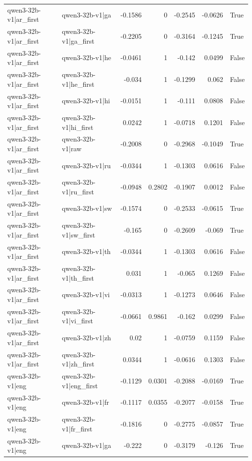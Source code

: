 \begin{table}
\begin{tabular}{l l r r r r l}
qwen3-32b-v1|ar_first & qwen3-32b-v1|ga & -0.1586 & 0 & -0.2545 & -0.0626 & True \\
qwen3-32b-v1|ar_first & qwen3-32b-v1|ga_first & -0.2205 & 0 & -0.3164 & -0.1245 & True \\
qwen3-32b-v1|ar_first & qwen3-32b-v1|he & -0.0461 & 1 & -0.142 & 0.0499 & False \\
qwen3-32b-v1|ar_first & qwen3-32b-v1|he_first & -0.034 & 1 & -0.1299 & 0.062 & False \\
qwen3-32b-v1|ar_first & qwen3-32b-v1|hi & -0.0151 & 1 & -0.111 & 0.0808 & False \\
qwen3-32b-v1|ar_first & qwen3-32b-v1|hi_first & 0.0242 & 1 & -0.0718 & 0.1201 & False \\
qwen3-32b-v1|ar_first & qwen3-32b-v1|raw & -0.2008 & 0 & -0.2968 & -0.1049 & True \\
qwen3-32b-v1|ar_first & qwen3-32b-v1|ru & -0.0344 & 1 & -0.1303 & 0.0616 & False \\
qwen3-32b-v1|ar_first & qwen3-32b-v1|ru_first & -0.0948 & 0.2802 & -0.1907 & 0.0012 & False \\
qwen3-32b-v1|ar_first & qwen3-32b-v1|sw & -0.1574 & 0 & -0.2533 & -0.0615 & True \\
qwen3-32b-v1|ar_first & qwen3-32b-v1|sw_first & -0.165 & 0 & -0.2609 & -0.069 & True \\
qwen3-32b-v1|ar_first & qwen3-32b-v1|th & -0.0344 & 1 & -0.1303 & 0.0616 & False \\
qwen3-32b-v1|ar_first & qwen3-32b-v1|th_first & 0.031 & 1 & -0.065 & 0.1269 & False \\
qwen3-32b-v1|ar_first & qwen3-32b-v1|vi & -0.0313 & 1 & -0.1273 & 0.0646 & False \\
qwen3-32b-v1|ar_first & qwen3-32b-v1|vi_first & -0.0661 & 0.9861 & -0.162 & 0.0299 & False \\
qwen3-32b-v1|ar_first & qwen3-32b-v1|zh & 0.02 & 1 & -0.0759 & 0.1159 & False \\
qwen3-32b-v1|ar_first & qwen3-32b-v1|zh_first & 0.0344 & 1 & -0.0616 & 0.1303 & False \\
qwen3-32b-v1|eng & qwen3-32b-v1|eng_first & -0.1129 & 0.0301 & -0.2088 & -0.0169 & True \\
qwen3-32b-v1|eng & qwen3-32b-v1|fr & -0.1117 & 0.0355 & -0.2077 & -0.0158 & True \\
qwen3-32b-v1|eng & qwen3-32b-v1|fr_first & -0.1816 & 0 & -0.2775 & -0.0857 & True \\
qwen3-32b-v1|eng & qwen3-32b-v1|ga & -0.222 & 0 & -0.3179 & -0.126 & True \\

\end{tabular}
\end{table}
